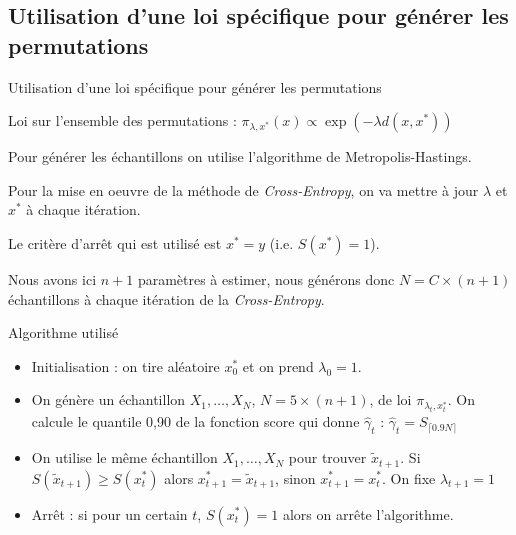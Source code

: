 \documentclass[10pt,xcolor=table,color={dvipsnames,usenames},ignorenonframetext,usepdftitle=false,french]{beamer}
\begin{document}
\hypertarget{utilisation-dune-loi-spuxe9cifique-pour-guxe9nuxe9rer-les-permutations}{%
\subsection{Utilisation d'une loi spécifique pour générer les
permutations}\label{utilisation-dune-loi-spuxe9cifique-pour-guxe9nuxe9rer-les-permutations}}

\begin{frame}{Utilisation d'une loi spécifique pour générer les
permutations}
\protect\hypertarget{utilisation-dune-loi-spuxe9cifique-pour-guxe9nuxe9rer-les-permutations-1}{}

Loi sur l'ensemble des permutations :
\(\pi_{\lambda,x^*}(x) \propto \exp{(-\lambda d(x,x^{*}))}\)

Pour générer les échantillons on utilise l'algorithme de
Metropolis-Hastings.

Pour la mise en oeuvre de la méthode de \emph{Cross-Entropy}, on va
mettre à jour \(\lambda\) et \(x^*\) à chaque itération.

Le critère d'arrêt qui est utilisé est \(x^*=y\) (i.e. \(S(x^*)=1\)).

Nous avons ici \(n+1\) paramètres à estimer, nous générons donc
\(N = C\times (n+1)\) échantillons à chaque itération de la
\emph{Cross-Entropy}.

\end{frame}

\begin{frame}{Algorithme utilisé}
\protect\hypertarget{algorithme-utilisuxe9-1}{}

\begin{itemize}
\item Initialisation : on tire aléatoire $x^*_0$ et on prend $\lambda_0=1$.
\item  On génère un échantillon $X_{1},\dots,X_{N}$, $N=5\times (n+1)$, de loi $\pi_{\lambda_t,x^*_t}$. On calcule le quantile 0,90 de la fonction score qui donne $\hat{\gamma}_{t}$ : $\hat{\gamma}_{t}=S_{\lceil0.9N\rceil}$
\item On utilise le même échantillon $X_{1},\dots,X_{N}$ pour trouver $\tilde x_{t+1}$. Si $S(\tilde x_{t+1})\geq S(x^*_t)$ alors $x^*_{t+1} = \tilde x_{t+1}$, sinon $x^*_{t+1}=x^*_{t}$. On fixe $\lambda_{t+1}=1$
\item Arrêt : si pour un certain $t$, $S(x^*_{t})=1$ alors on arrête l'algorithme.
\end{itemize}

\end{frame}
\end{document}
